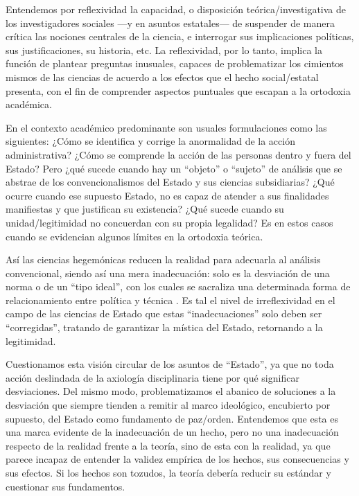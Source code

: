 \documentclass[
  spanish,
  11pt,
  a4paper,
]{scrbook}
\begin{document}
Entendemos por reflexividad la capacidad, o disposición
teórica/investigativa de los investigadores sociales ---y en asuntos
estatales--- de suspender de manera crítica las nociones centrales de la
ciencia, e interrogar sus implicaciones políticas, sus justificaciones,
su historia, etc. La reflexividad, por lo tanto, implica la función de
plantear preguntas inusuales, capaces de problematizar los cimientos
mismos de las ciencias de acuerdo a los efectos que el hecho
social/estatal presenta, con el fin de comprender aspectos puntuales que
escapan a la ortodoxia académica.

En el contexto académico predominante son usuales formulaciones como las
siguientes: ¿Cómo se identifica y corrige la anormalidad de la acción
administrativa? ¿Cómo se comprende la acción de las personas dentro y
fuera del Estado? Pero ¿qué sucede cuando hay un ``objeto'' o ``sujeto''
de análisis que se abstrae de los convencionalismos del Estado y sus
ciencias subsidiarias? ¿Qué ocurre cuando ese supuesto Estado, no es
capaz de atender a sus finalidades manifiestas y que justifican su
existencia? ¿Qué sucede cuando su unidad/legitimidad no concuerdan con
su propia legalidad? Es en estos casos cuando se evidencian algunos
límites en la ortodoxia teórica.

Así las ciencias hegemónicas reducen la realidad para adecuarla al
análisis convencional, siendo así una mera inadecuación: solo es la
desviación de una norma o de un ``tipo ideal'', con los cuales se
sacraliza una determinada forma de relacionamiento entre política y
técnica \autocite{GilVillegas2000}. Es tal el nivel de irreflexividad en
el campo de las ciencias de Estado que estas ``inadecuaciones'' solo
deben ser ``corregidas'', tratando de garantizar la mística del Estado,
retornando a la legitimidad.

Cuestionamos esta visión circular de los asuntos de ``Estado'', ya que
no toda acción deslindada de la axiología disciplinaria tiene por qué
significar desviaciones. Del mismo modo, problematizamos el abanico de
soluciones a la desviación que siempre tienden a remitir al marco
ideológico, encubierto por supuesto, del Estado como fundamento de
paz/orden. Entendemos que esta es una marca evidente de la inadecuación
de un hecho, pero no una inadecuación respecto de la realidad frente a
la teoría, sino de esta con la realidad, ya que parece incapaz de
entender la validez empírica de los hechos, sus consecuencias y sus
efectos. Si los hechos son tozudos, la teoría debería reducir su
estándar y cuestionar sus fundamentos.
\end{document}
